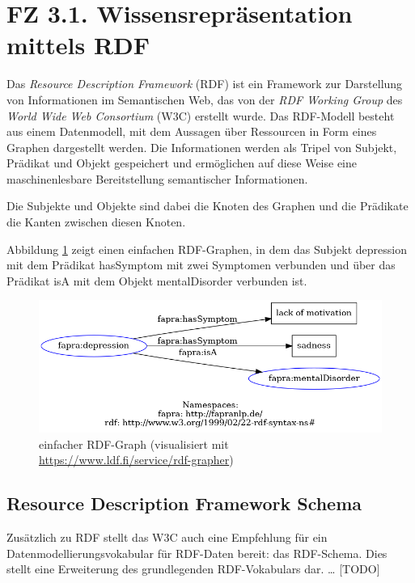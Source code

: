 %
%
\section{FZ 3.1. Wissensrepräsentation mittels RDF}
\label{sec:fz3.1.} 

Das \emph{Resource Description Framework} (RDF) \citep{w3c_all_2022} ist ein Framework zur Darstellung von Informationen im Semantischen Web, das von der \emph{RDF Working Group} des  \emph{World Wide Web Consortium} (W3C) erstellt wurde. Das RDF-Modell besteht aus einem Datenmodell, mit dem Aussagen über Ressourcen in Form eines Graphen dargestellt werden. Die Informationen werden als Tripel von Subjekt, Prädikat und Objekt gespeichert und ermöglichen auf diese Weise eine maschinenlesbare Bereitstellung semantischer Informationen.

Die Subjekte und Objekte sind dabei die Knoten des Graphen und die Prädikate die Kanten zwischen diesen Knoten.

Abbildung \ref{fig:rdfgraph} zeigt einen einfachen RDF-Graphen, in dem das Subjekt \glqq depression\grqq{} mit dem Prädikat \glqq hasSymptom\grqq{} mit zwei Symptomen verbunden und über das Prädikat \glqq isA\grqq{} mit dem Objekt \glqq mentalDisorder\grqq{} verbunden ist.

\begin{figure}[h]
    \centering
    \includegraphics[width=\textwidth]{pictures/rdf-graph.png}
    \caption{einfacher RDF-Graph (visualisiert mit \url{https://www.ldf.fi/service/rdf-grapher})}
    \label{fig:rdfgraph}
\end{figure}

\subsection{Resource Description Framework Schema}

Zusätzlich zu RDF stellt das W3C auch eine Empfehlung für ein Datenmodellierungsvokabular für RDF-Daten bereit: das RDF-Schema. Dies stellt eine Erweiterung des grundlegenden RDF-Vokabulars dar. \dots{} [TODO]

